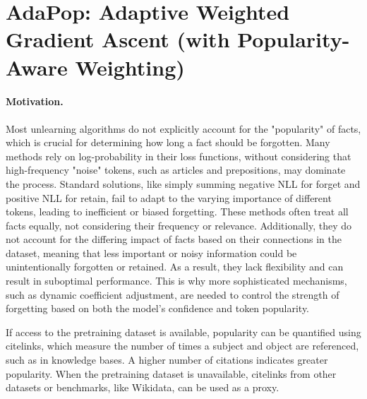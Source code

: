 

\section{AdaPop: Adaptive Weighted Gradient Ascent (with Popularity-Aware Weighting)}

\paragraph{Motivation.}  

Most unlearning algorithms do not explicitly account for the "popularity" of facts, which is crucial for determining how long a fact should be forgotten. Many methods rely on log-probability in their loss functions, without considering that high-frequency "noise" tokens, such as articles and prepositions, may dominate the process. Standard solutions, like simply summing negative NLL for forget and positive NLL for retain, fail to adapt to the varying importance of different tokens, leading to inefficient or biased forgetting. These methods often treat all facts equally, not considering their frequency or relevance. Additionally, they do not account for the differing impact of facts based on their connections in the dataset, meaning that less important or noisy information could be unintentionally forgotten or retained. As a result, they lack flexibility and can result in suboptimal performance. This is why more sophisticated mechanisms, such as dynamic coefficient adjustment, are needed to control the strength of forgetting based on both the model's confidence and token popularity.

If access to the pretraining dataset is available, popularity can be quantified using citelinks, which measure the number of times a subject and object are referenced, such as in knowledge bases. A higher number of citations indicates greater popularity. When the pretraining dataset is unavailable, citelinks from other datasets or benchmarks, like Wikidata, can be used as a proxy.

